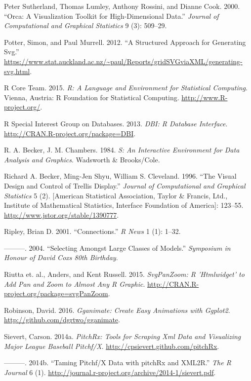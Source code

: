 \documentclass[12pt,]{isuthesis}
\begin{document}
\hypertarget{ref-orca}{}
Peter Sutherland, Thomas Lumley, Anthony Rossini, and Dianne Cook. 2000.
``Orca: A Visualization Toolkit for High-Dimensional Data.''
\emph{Journal of Computational and Graphical Statistics} 9 (3): 509--29.

\hypertarget{ref-gridSVGreport}{}
Potter, Simon, and Paul Murrell. 2012. ``A Structured Approach for
Generating Svg.''
\url{https://www.stat.auckland.ac.nz/~paul/Reports/gridSVGviaXML/generating-svg.html}.

\hypertarget{ref-RCore}{}
R Core Team. 2015. \emph{R: A Language and Environment for Statistical
Computing}. Vienna, Austria: R Foundation for Statistical Computing.
\url{http://www.R-project.org/}.

\hypertarget{ref-DBI}{}
R Special Interest Group on Databases. 2013. \emph{DBI: R Database
Interface}. \url{http://CRAN.R-project.org/package=DBI}.

\hypertarget{ref-S:1984}{}
R. A. Becker, J. M. Chambers. 1984. \emph{S: An Interactive Environment
for Data Analysis and Graphics}. Wadsworth \& Brooks/Cole.

\hypertarget{ref-trellis}{}
Richard A. Becker, Ming-Jen Shyu, William S. Cleveland. 1996. ``The
Visual Design and Control of Trellis Display.'' \emph{Journal of
Computational and Graphical Statistics} 5 (2). {[}American Statistical
Association, Taylor \& Francis, Ltd., Institute of Mathematical
Statistics, Interface Foundation of America{]}: 123--55.
\url{http://www.jstor.org/stable/1390777}.

\hypertarget{ref-Connections}{}
Ripley, Brian D. 2001. ``Connections.'' \emph{R News} 1 (1): 1--32.

\hypertarget{ref-Ripley:2004}{}
---------. 2004. ``Selecting Amongst Large Classes of Models.''
\emph{Symposium in Honour of David Coxs 80th Birthday}.

\hypertarget{ref-svgPanZoom}{}
Riutta et. al., Anders, and Kent Russell. 2015. \emph{SvgPanZoom: R
'Htmlwidget' to Add Pan and Zoom to Almost Any R Graphic}.
\url{http://CRAN.R-project.org/package=svgPanZoom}.

\hypertarget{ref-gganimate}{}
Robinson, David. 2016. \emph{Gganimate: Create Easy Animations with
Ggplot2}. \url{http://github.com/dgrtwo/gganimate}.

\hypertarget{ref-pitchRx}{}
Sievert, Carson. 2014a. \emph{PitchRx: Tools for Scraping Xml Data and
Visualizing Major League Baseball Pitchf/X}.
\url{http://cpsievert.github.com/pitchRx}.

\hypertarget{ref-Sievert:2014a}{}
---------. 2014b. ``Taming Pitchf/X Data with pitchRx and XML2R.''
\emph{The R Journal} 6 (1).
\url{http://journal.r-project.org/archive/2014-1/sievert.pdf}.
\end{document}
